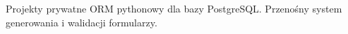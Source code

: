 \begin{rubric}{Projekty prywatne}
ORM pythonowy dla bazy PostgreSQL.
Przenośny system generowania i walidacji formularzy.
\end{rubric}

